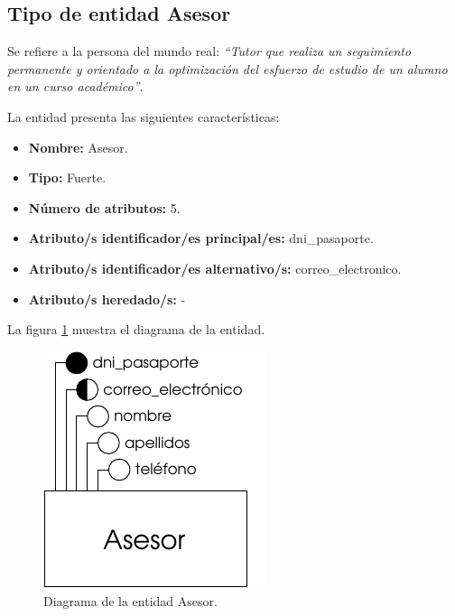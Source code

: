 \subsection{Tipo de entidad Asesor}

   \begin{description}

   \item[Definición] Se refiere a la persona del mundo real: \emph{``Tutor que
        realiza un seguimiento permanente y orientado a la optimización del
        esfuerzo de estudio de un alumno en un curso académico''}.

   \item[Características] La entidad presenta las siguientes características:
      \begin{itemize}
         \item \textbf{Nombre:} Asesor.
         \item \textbf{Tipo:} Fuerte.
         \item \textbf{Número de atributos:} 5.
         \item \textbf{Atributo/s identificador/es principal/es:} dni\_pasaporte.
         \item \textbf{Atributo/s identificador/es alternativo/s:} correo\_electronico.
         \item \textbf{Atributo/s heredado/s:} -
      \end{itemize}

   \item[Diagrama] La figura \ref{diagramaAsesor} muestra el diagrama de la entidad.
   \item \begin{figure}[!ht]
            \begin{center}
            \includegraphics[]{07.Modelo_Entidad-Interrelacion/7.2.Analisis_Entidades/diagramas/asesor.pdf}
            \caption{Diagrama de la entidad Asesor.}
            \label{diagramaAsesor}
            \end{center}
         \end{figure}


\end{description}
